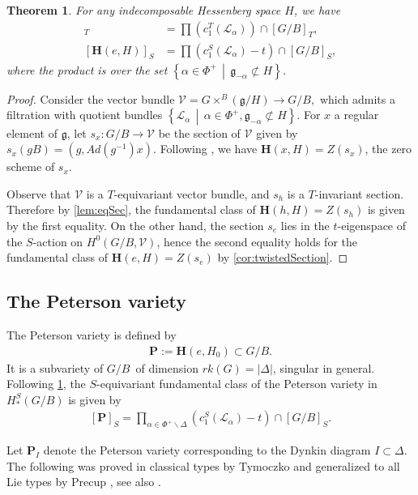 \documentclass[10pt]{article}
\newtheorem{thm}{Theorem}
\numberwithin{thm}{section}
\theoremstyle{definition}
\theoremstyle{remark}
\newcommand{\Pet}{\ensuremath{\mathbf{P}}}
\newcommand{\Fl}{\ensuremath{G/B}}
\newcommand{\g}{\ensuremath{\mathfrak g}}
\newcommand{\Hess}{\mathbf H}
\newcommand{\set}[2]{\left\{#1\,\middle\vert\,#2\right\}}
\begin{document}
\begin{thm}
\label{HessClass}
For any indecomposable Hessenberg space $H$, we have
\begin{align*}
[\Hess(h,H)]_T&=\prod\left(c_1^T(\mathcal L_\alpha)\right)\cap[\Fl]_T,\\
[\Hess(e,H)]_S&=\prod\left(c_1^S(\mathcal L_\alpha)-t\right)\cap[\Fl]_S,
\end{align*}
where the product is over the set $\set{\alpha\in\Phi^+}{\g_{-\alpha}\not\subset H}$.
\end{thm}
\begin{proof}
Consider the vector bundle
$
\mathcal V=G\times^B(\g/H)\to G/B,
$
which admits a filtration with quotient bundles
$
\set{\mathcal L_\alpha}{\alpha\in\Phi^+,\g_{-\alpha}\not\subset H}.
$
For $x$ a regular element of \g,
let $s_x:G/B\to\mathcal V$ be the section of $\mathcal V$ given by $s_x(gB)=(g, Ad(g^{-1})x)$.
Following \cite[Prop 3.6]{abe.fujita.zeng},
we have $\Hess(x,H)=Z(s_x)$, the zero scheme of $s_x$.

Observe that $\mathcal V$ is a $T$-equivariant vector bundle,
and $s_h$ is a $T$-invariant section.
Therefore by \cref{lem:eqSec},
the fundamental class of $\Hess(h,H)=Z(s_h)$ is given by the first equality.
On the other hand, the section $s_e$ lies in the $t$-eigenspace of the $S$-action on $H^0(G/B,\mathcal V)$,
hence the second equality holds for the fundamental class of $\Hess(e,H)=Z(s_e)$ by \cref{cor:twistedSection}.
\end{proof}

\subsection{The Peterson variety}
\label{subsec:petersonVariety}
The Peterson variety is defined by
\begin{align}
\label{defn:Pet}
\Pet:= \Hess(e,H_0)\subset\Fl.
\end{align}
It is a subvariety of \Fl\ of dimension $rk(G)=|\Delta|$, singular in general.
Following \cref{HessClass}, the $S$-equivariant fundamental class of the Peterson variety in $H_*^S(G/B)$ is given by
\begin{align}
\label{PetClass}
[\Pet]_S=\prod\limits_{\alpha\in\Phi^+\backslash\Delta}\left(c_1^S\left(\mathcal L_\alpha\right)-t\right)\cap[\Fl]_S.
\end{align}


Let $\Pet_I$ denote the Peterson variety corresponding to the Dynkin diagram $I\subset\Delta$.
The following was proved in classical types by Tymoczko \cite[Thm~4.3]{tymoczko:paving}
and generalized to all Lie types by Precup \cite{precup},
see also \cite[Appendix A]{gms:peterson}.
\end{document}
